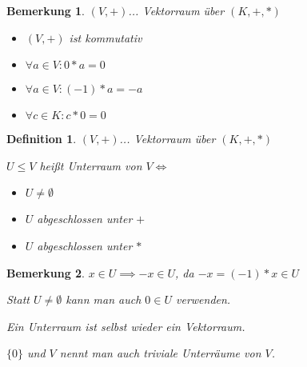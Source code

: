\documentclass[twocolumn]{article}
\newtheorem{definition}{Definition}[section]
\newtheorem*{remark}{Bemerkung}
\newcommand*{\logeq}{\Leftrightarrow}
\begin{document}
\begin{remark}
	$(V,+)$... Vektorraum über $(K,+,*)$
	
	\begin{itemize}
		\item $(V,+)$ ist kommutativ
		\item $\forall a \in V : 0*a=0$
		\item $\forall a \in V : (-1) * a = -a$
		\item $\forall c \in K : c * 0 = 0$
	\end{itemize}
\end{remark}

\begin{definition}
	$(V,+)$... Vektorraum über $(K,+,*)$
	
	$U \leq V$ heißt Unterraum von $V \logeq$
	
	\begin{itemize}
		\item $U \neq \emptyset$
		\item $U$ abgeschlossen unter $+$
		\item $U$ abgeschlossen unter $*$
	\end{itemize}
\end{definition}

\begin{remark}
	$x \in U \implies -x \in U$, da $-x = (-1)*x \in U$
	
	Statt $U \neq \emptyset$ kann man auch $0 \in U$ verwenden.
	
	Ein Unterraum ist selbst wieder ein Vektorraum.
	
	$\{0\}$ und $V$ nennt man auch triviale Unterräume von $V$.
\end{remark}
\end{document}
